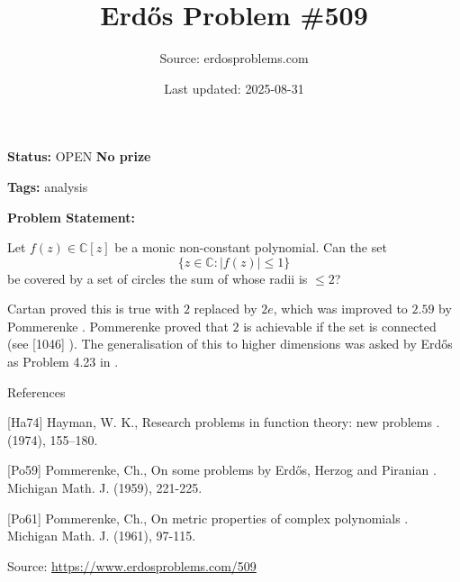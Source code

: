 \documentclass{article}
\title{Erd\H{o}s Problem \#509}
\date{Last updated: 2025-08-31}
\author{Source: erdosproblems.com}
\begin{document}
\maketitle

\noindent\textbf{Status:} OPEN \quad \textbf{No prize}

\noindent\textbf{Tags:} analysis

\medskip

\noindent\textbf{Problem Statement:}

Let $f(z)\in\mathbb{C}[z]$ be a monic non-constant polynomial. Can the set\[\{ z\in \mathbb{C} : \lvert f(z)\rvert \leq 1\}\]be covered by a set of circles the sum of whose radii is $\leq 2$?




Cartan proved this is true with $2$ replaced by $2e$, which was improved to $2.59$ by Pommerenke \cite{Po61}. Pommerenke \cite{Po59} proved that $2$ is achievable if the set is connected (see [1046] ). The generalisation of this to higher dimensions was asked by Erd\H{o}s as Problem 4.23 in \cite{Ha74}.




References

[Ha74] Hayman, W. K., Research problems in function theory: new problems . (1974), 155--180.

[Po59] Pommerenke, Ch., On some problems by Erd\H{o}s, Herzog and Piranian . Michigan Math. J. (1959), 221-225.

[Po61] Pommerenke, Ch., On metric properties of complex polynomials . Michigan Math. J. (1961), 97-115.


\bigskip
\noindent\small{Source: \url{https://www.erdosproblems.com/509}}
\end{document}
